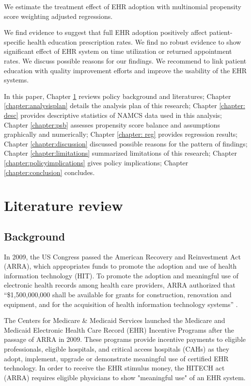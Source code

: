 \documentclass[12pt]{report}
\begin{document}
We estimate the treatment effect of EHR adoption with multinomial propensity score weighting adjusted regressions. 

We find evidence to suggest that full EHR adoption positively affect patient-specific health education prescription rates. We find no robust evidence to show significant effect of EHR system on time utilization or returned appointment rates. We discuss possible reasons for our findings. We recommend to link patient education with quality improvement efforts and improve the usability of the EHR systems.

In this paper, Chapter \ref{chapter:lit} reviews policy background and literatures; Chapter \ref{chapter:analysisplan} details the analysis plan of this research; Chapter \ref{chapter: desc} provides descriptive statistics of NAMCS data used in this analysis; Chapter \ref{chapter:psb} assesses propensity score balance and assumptions graphically and numerically; Chapter \ref{chapter: reg} provides regression results; Chapter \ref{chapter:discussion} discussed possible reasons for the pattern of findings; Chapter \ref{chapter:limitations} summarized limitations of this research; Chapter \ref{chapter:policyimplications} gives policy implications; Chapter \ref{chapter:conclusion} concludes. 

\chapter{Literature review}
\label{chapter:lit}
\section{Background}

In 2009, the US Congress passed the American Recovery and Reinvestment Act (ARRA), which appropriates funds to promote the adoption and use of health information technology (HIT). To promote the adoption and meaningful use of electronic health records among health care providers, ARRA authorized that ``\$1,500,000,000 shall be available for grants for construction, renovation and equipment, and for the acquisition of health information technology systems'' \citep{AARALaw}. 

The Centers for Medicare \& Medicaid Services launched the Medicare and Medicaid Electronic Health Care Record (EHR) Incentive Programs after the passage of ARRA in 2009. These programs provide incentive payments to eligible professionals, eligible hospitals, and critical access hospitals (CAHs) as they adopt, implement, upgrade or demonstrate meaningful use of certified EHR technology. In order to receive the EHR stimulus money, the HITECH act (ARRA) requires eligible physicians to show "meaningful use" of an EHR system.
\end{document}
